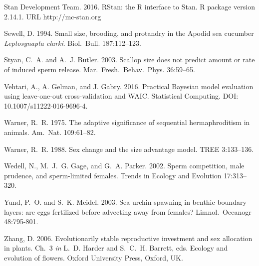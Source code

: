 \documentclass{article}
\begin{document}
\begin{thebibliography}{}
Stan Development Team. 2016.
\newblock RStan: the R interface to Stan.
\newblock R package version 2.14.1. URL http://mc-stan.org

Sewell, D. 1994.
\newblock Small size, brooding, and protandry in the Apodid sea cucumber \textit{Leptosynapta clarki}.
\newblock Biol.~Bull. 187:112--123.

Styan, C.~A. and A.~J. Butler. 2003.
\newblock Scallop size does not predict amount or rate of induced sperm release.
\newblock Mar.~Fresh.~Behav.~Phys. 36:59--65.

Vehtari, A., A. Gelman, and J. Gabry. 2016.
\newblock Practical Bayesian model evaluation using leave-one-out cross-validation and WAIC.
\newblock Statistical Computing. DOI: 10.1007/s11222-016-9696-4.

Warner, R.~R. 1975.
\newblock The adaptive significance of sequential hermaphroditism in animals.
\newblock Am.~Nat. 109:61--82.

Warner, R.~R. 1988.
\newblock Sex change and the size advantage model.
\newblock TREE 3:133--136.

Wedell, N., M.~J.~G. Gage, and G.~A. Parker. 2002.
\newblock Sperm competition, male prudence, and sperm-limited females.
\newblock Trends in Ecology and Evolution 17:313--320.

Yund, P.~O. and S.~K. Meidel. 2003.
\newblock Sea urchin spawning in benthic boundary layers: are eggs fertilized before advecting away from females?
\newblock Limnol.~Oceanogr 48:795-801.

Zhang, D. 2006.
\newblock Evolutionarily stable reproductive investment and sex allocation in plants.
\newblock Ch.~3 \emph{in} L.~D. Harder and S.~C.~H. Barrett, eds. Ecology and evolution of flowers. Oxford University Press, Oxford, UK.


\end{thebibliography}
\end{document}
